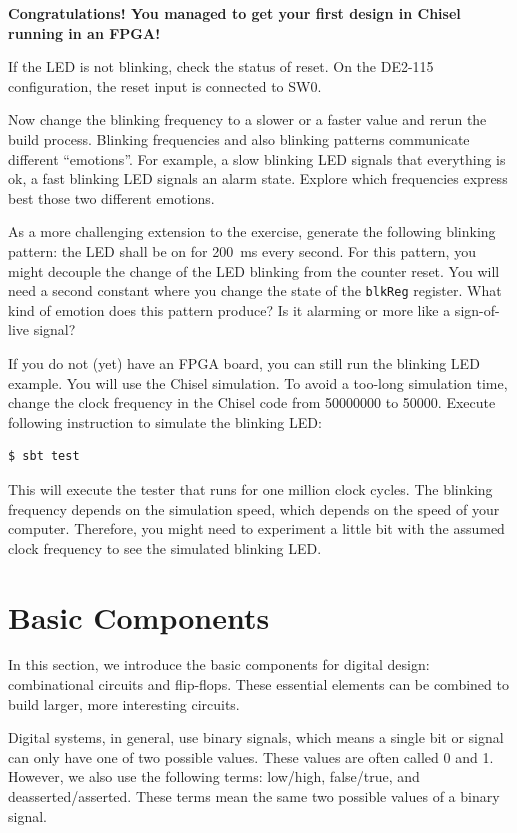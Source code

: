 \documentclass[%
    10pt,
    headinclude, footexclude,
    openright, %
    notitlepage,
    cleardoubleempty,
    headsepline,
    pointlessnumbers,
    bibtotoc, idxtotoc,
    ]{scrbook}
\newcommand{\code}[1]{{\lstinline[basicstyle=\small\ttfamily]{#1}}}
\begin{document}
{\bf Congratulations! You managed to get your first design in Chisel running in an FPGA!}

If the LED is not blinking, check the status of reset. On the DE2-115 configuration,
the reset input is connected to SW0.

Now change the blinking frequency to a slower or a faster value and
rerun the build process. Blinking frequencies and also blinking patterns
communicate different ``emotions''. For example, a slow blinking LED signals that
everything is ok, a fast blinking LED signals an alarm state.
Explore which frequencies express best those two different emotions.

As a more challenging extension to the exercise, generate the following blinking pattern:
the LED shall be on for 200~ms every second. For this pattern, you might
decouple the change of the LED blinking from the counter reset.
You will need a second constant where you change the state of the
\code{blkReg} register. What kind of emotion does this pattern produce?
Is it alarming or more like a sign-of-live signal?

If you do not (yet) have an FPGA board, you can still run the blinking LED example.
You will use the Chisel simulation. To avoid a too-long simulation time, change the
clock frequency in the Chisel code from 50000000 to 50000. Execute following
instruction to simulate the blinking LED:

\begin{verbatim}
$ sbt test
\end{verbatim}

This will execute the tester that runs for one million clock cycles.
The blinking frequency depends on the simulation speed, which depends on the
speed of your computer. Therefore, you might need to experiment a little bit
with the assumed clock frequency to see the simulated blinking LED.

\chapter{Basic Components}

In this section, we introduce the basic components for digital design:
combinational circuits and flip-flops.
These essential elements can be combined to build larger, more interesting circuits.

Digital systems, in general, use binary signals, which means a single bit or signal
can only have one of two possible values. These values are often called 0 and 1. However, we
also use the following terms: low/high, false/true, and deasserted/asserted.
These terms mean the same two possible values of a binary signal.
\end{document}
